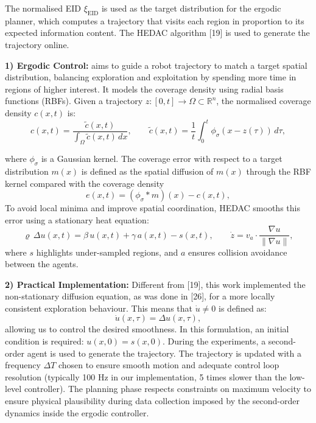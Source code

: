 \documentclass[11pt]{article}
\begin{document}
The normalised EID $\xi_{\mathrm{EID}}$ is used as the target
distribution for the ergodic planner, which computes a trajectory
that visits each region in proportion to its expected information
content. The HEDAC algorithm [19] is used to generate the trajectory
online.

\textbf{1) Ergodic Control:} aims to guide a robot trajectory to
match a target spatial distribution, balancing exploration and
exploitation by spending more time in regions of higher interest. It
models the coverage density using radial basis functions (RBFs).
Given a trajectory
$z: [0, t] \to \Omega \subset \mathbb{R}^{n}$,
the normalised coverage density $c(x, t)$ is:
\[
c(x, t) = \frac{\tilde{c}(x, t)}{\int_{\Omega} \tilde{c}(x, t)\,dx},
\qquad
\tilde{c}(x, t) = \frac{1}{t}\int_{0}^{t}
\phi_{\sigma}(x - z(\tau))\,d\tau,
\]

\newpage

\setcounter{equation}{3}

where $\phi_{\sigma}$ is a Gaussian kernel. The coverage error with
respect to a target distribution $m(x)$ is defined as the spatial
diffusion of $m(x)$ through the RBF kernel compared with the coverage
density
\begin{equation}
e(x, t) = (\phi_{\sigma} * m)(x) - c(x, t),
\end{equation}
To avoid local minima and improve spatial coordination, HEDAC
smooths this error using a stationary heat equation:
\[
\varrho\, \Delta u(x, t) = \beta\, u(x, t) + \gamma\, a(x, t) - s(x, t),
\qquad
\dot{z} = v_{a} \cdot \frac{\nabla u}{\|\nabla u\|},
\]
where $s$ highlights under-sampled regions, and $a$ ensures
collision avoidance between the agents.

\textbf{2) Practical Implementation:} Different from [19], this work
implemented the non-stationary diffusion equation, as was done in
[26], for a more locally consistent exploration behaviour. This means
that $\dot{u} \ne 0$ is defined as:
\begin{equation}
\dot{u}(x, \tau) = \Delta u(x, \tau),
\end{equation}
allowing us to control the desired smoothness. In this formulation,
an initial condition is required: $u(x, 0) = s(x, 0)$. During the
experiments, a second-order agent is used to generate the trajectory.
The trajectory is updated with a frequency $\Delta T$ chosen to
ensure smooth motion and adequate control loop resolution (typically
100 Hz in our implementation, 5 times slower than the low-level
controller). The planning phase respects constraints on maximum
velocity to ensure physical plausibility during data collection
imposed by the second-order dynamics inside the ergodic controller.
\end{document}
